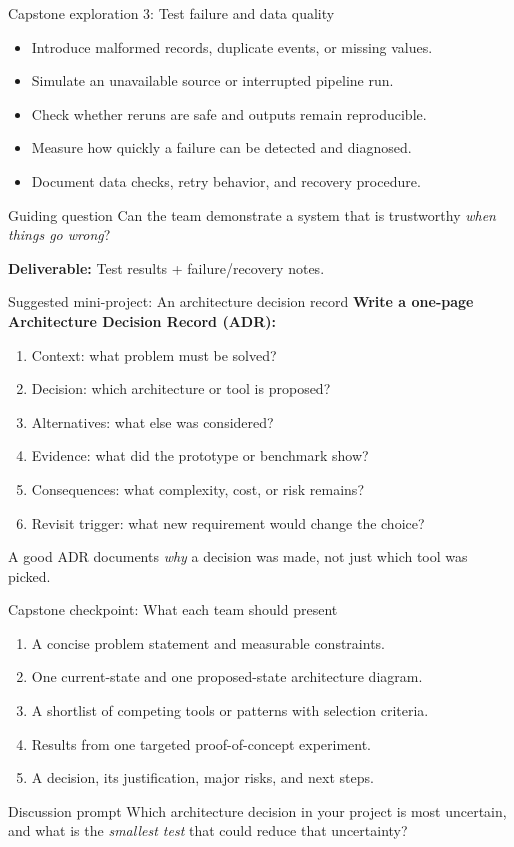 \documentclass[aspectratio=43,10pt]{beamer}
\begin{document}
\begin{frame}{Capstone exploration 3: Test failure and data quality}
\begin{itemize}
  \item Introduce malformed records, duplicate events, or missing values.
  \item Simulate an unavailable source or interrupted pipeline run.
  \item Check whether reruns are safe and outputs remain reproducible.
  \item Measure how quickly a failure can be detected and diagnosed.
  \item Document data checks, retry behavior, and recovery procedure.
\end{itemize}
\begin{alertblock}{Guiding question}
Can the team demonstrate a system that is trustworthy \emph{when things go wrong}?
\end{alertblock}
\textbf{Deliverable:} Test results + failure/recovery notes.
\end{frame}

\begin{frame}{Suggested mini-project: An architecture decision record}
\textbf{Write a one-page Architecture Decision Record (ADR):}
\begin{enumerate}
  \item Context: what problem must be solved?
  \item Decision: which architecture or tool is proposed?
  \item Alternatives: what else was considered?
  \item Evidence: what did the prototype or benchmark show?
  \item Consequences: what complexity, cost, or risk remains?
  \item Revisit trigger: what new requirement would change the choice?
\end{enumerate}
\vspace{0.4em}
\small A good ADR documents \emph{why} a decision was made, not just which tool was picked.
\end{frame}

\begin{frame}{Capstone checkpoint: What each team should present}
\begin{enumerate}
  \item A concise problem statement and measurable constraints.
  \item One current-state and one proposed-state architecture diagram.
  \item A shortlist of competing tools or patterns with selection criteria.
  \item Results from one targeted proof-of-concept experiment.
  \item A decision, its justification, major risks, and next steps.
\end{enumerate}
\begin{block}{Discussion prompt}
Which architecture decision in your project is most uncertain, and what is the \emph{smallest test} that could reduce that uncertainty?
\end{block}
\end{frame}
\end{document}
